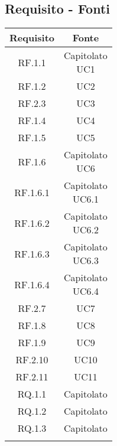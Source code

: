 \subsection{Requisito - Fonti}
\begin{table}[H]
  \centering
  \begin{tabular}{|c|c|}
    \hline
    \rowcolor[HTML]{036400}
    {\color[HTML]{FFFFFF} Requisito} & {\color[HTML]{FFFFFF} Fonte} \\ \hline
    \rowcolor[HTML]{EFEFEF}
    RF.1.1 & \req{Capitolato \\ UC1} \\ \hline
    \rowcolor[HTML]{C0C0C0}
    RF.1.2 & UC2 \\ \hline
    \rowcolor[HTML]{EFEFEF}
    RF.2.3 & UC3 \\ \hline
    \rowcolor[HTML]{C0C0C0}
    RF.1.4 & UC4 \\ \hline
    \rowcolor[HTML]{EFEFEF}
    RF.1.5 & UC5 \\ \hline
    \rowcolor[HTML]{C0C0C0}
    RF.1.6 & \req{Capitolato \\ UC6} \\ \hline
    \rowcolor[HTML]{EFEFEF}
    RF.1.6.1 & \req{Capitolato \\ UC6.1} \\ \hline
    \rowcolor[HTML]{C0C0C0}
    RF.1.6.2 & \req{Capitolato \\ UC6.2} \\ \hline
    \rowcolor[HTML]{EFEFEF}
    RF.1.6.3 & \req{Capitolato \\ UC6.3} \\ \hline
    \rowcolor[HTML]{C0C0C0}
    RF.1.6.4 & \req{Capitolato \\ UC6.4} \\ \hline
    \rowcolor[HTML]{EFEFEF}
    RF.2.7 & UC7 \\ \hline
    \rowcolor[HTML]{C0C0C0}
    RF.1.8 & UC8 \\ \hline
    \rowcolor[HTML]{EFEFEF}
    RF.1.9 & UC9 \\ \hline
    \rowcolor[HTML]{C0C0C0}
    RF.2.10 & UC10 \\ \hline
    \rowcolor[HTML]{EFEFEF}
    RF.2.11 & UC11 \\ \hline
    \rowcolor[HTML]{C0C0C0}
    RQ.1.1 & Capitolato \\ \hline
    \rowcolor[HTML]{EFEFEF}
    RQ.1.2 & Capitolato \\ \hline
    \rowcolor[HTML]{C0C0C0}
    RQ.1.3 & Capitolato \\ \hline
    \rowcolor[HTML]{EFEFEF}

\end{tabular}
\end{table}
